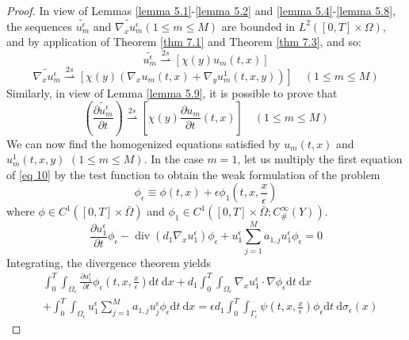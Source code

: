 \begin{proof}
In view of Lemmas \eqref{lemma 5.1}-\eqref{lemma 5.2} and \eqref{lemma 5.4}-\eqref{lemma 5.8}, the sequences $\widetilde{u_{m}^{\epsilon}}$ and $\widetilde{\nabla_{x} u_{m}^{\epsilon}}(1 \leq m \leq M)$ are bounded in $L^{2}([0, T] \times \Omega)$, and by application of Theorem \eqref{thm 7.1} and Theorem \eqref{thm 7.3}, and so:
\begin{equation}
\widetilde{u_{m}^{\epsilon}}  \overset{2s}{\rightharpoonup}
\left[\chi(y) u_{m}(t, x)\right]
\end{equation}
\begin{equation}
\widetilde{\nabla_{x} u_{m}^{\epsilon}}
\overset{2s}{\rightharpoonup}
\left[\chi(y)\left(\nabla_{x} u_{m}(t, x)+\right.\right.\left.\left.\nabla_{y} u_{m}^{1}(t, x, y)\right)\right] \quad (1 \leq m \leq M)
\end{equation}
Similarly, in view of Lemma \eqref{lemma 5.9}, it is possible to prove that
\begin{equation}
\left(\widetilde{\frac{\partial u_{m}^{\epsilon}}{\partial t}}\right)
\overset{2s}{\rightharpoonup}
\left[\chi(y) \frac{\partial u_{m}}{\partial t}(t, x)\right]  \quad (1 \leq m \leq M)
\end{equation}
We can now find the homogenized equations satisfied by $u_{m}(t, x)$ and $u_{m}^{1}(t, x, y)$ $(1 \leq m \leq M)$.
In the case $m=1$, let us multiply the first equation of \eqref{eq 10} by the test function to obtain the weak formulation of the problem
$$
\phi_{\epsilon} \equiv \phi(t, x)+\epsilon \phi_{1}\left(t, x, \frac{x}{\epsilon}\right)
$$
where $\phi \in C^{1}([0, T] \times \bar{\Omega})$ and $\phi_{1} \in C^{1}\left([0, T] \times \bar{\Omega} ; C_{\#}^{\infty}(Y)\right)$. 
\begin{equation*}
    \frac{\partial u_{1}^{\epsilon}}{\partial t}\phi_{\epsilon}-\operatorname{div}\left(d_{1} \nabla_{x} u_{1}^{\epsilon}\right)\phi_{\epsilon}+u_{1}^{\epsilon} \sum_{j=1}^{M} a_{1, j} u_{1}^{\epsilon}\phi_{\epsilon}=0
\end{equation*}
Integrating, the divergence theorem yields
\begin{equation}
  \begin{aligned}
&\int_{0}^{T} \int_{\Omega_{\epsilon}} \frac{\partial u_{1}^{\epsilon}}{\partial t} \phi_{\epsilon}\left(t, x, \frac{x}{\epsilon}\right) \mathrm{d} t \mathrm{~d} x+d_{1} \int_{0}^{T} \int_{\Omega_{\epsilon}} \nabla_{x} u_{1}^{\epsilon} \cdot \nabla \phi_{\epsilon} \mathrm{d} t \mathrm{~d} x \\
&+\int_{0}^{T} \int_{\Omega_{\epsilon}} u_{1}^{\epsilon} \sum_{j=1}^{M} a_{1, j} u_{j}^{\epsilon} \phi_{\epsilon} \mathrm{d} t \mathrm{~d} x=\epsilon d_{1} \int_{0}^{T} \int_{\Gamma_{\epsilon}} \psi\left(t, x, \frac{x}{\epsilon}\right) \phi_{\epsilon} \mathrm{d} t \mathrm{~d} \sigma_{\epsilon}(x)

\end{aligned}
\end{equation}
\end{proof}
